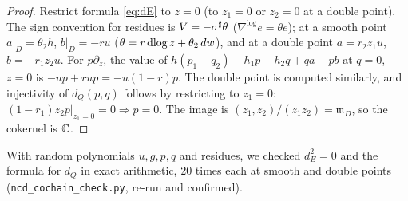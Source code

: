 \begin{proof}
Restrict formula \eqref{eq:dE} to $z=0$ (to $z_1=0$ or $z_2=0$ at a double point). The sign convention for residues is $V=-\sigma^\sharp\theta$ ($\nabla^{\log}e=\theta e$); at a smooth point $a|_D=\theta_2h$, $b|_D=-ru$ ($\theta=r\,\mathrm{dlog}\, z+\theta_2\,dw$), and at a double point $a=r_2z_1u$, $b=-r_1z_2u$. For $p\partial_z$, the value of $h(p_1+q_2)-h_1p-h_2q+qa-pb$ at $q=0$, $z=0$ is $-up+rup=-u(1-r)p$. The double point is computed similarly, and injectivity of $d_Q(p,q)$ follows by restricting to $z_1=0$: $(1-r_1)z_2p|_{z_1=0}=0\Rightarrow p=0$. The image is $(z_1,z_2)/(z_1z_2)=\mathfrak m_D$, so the cokernel is $\mathbb C$. \qedhere
\end{proof}
\tV With random polynomials $u,g,p,q$ and residues, we checked $d_E^2=0$ and the formula for $d_Q$ in exact arithmetic, 20 times each at smooth and double points (\texttt{ncd\_cochain\_check.py}, re-run and confirmed).

